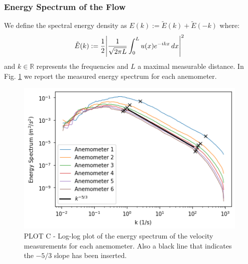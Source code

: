 \documentclass[11pt,titlepage]{article}
\begin{document}
\subsubsection{Energy Spectrum of the Flow} \label{energy_spectrum}
We define the spectral energy density as $E(k) :=\tilde{E}(k) + \tilde{E}(-k)$ where:
\begin{equation*}
	\tilde{E}(k):= \frac{1}{2} \abs{\frac{1}{\sqrt{2\pi L}} \int_0^L u(x) e^{-ikx}\, dx}^2
\end{equation*}
and $k\in \mathbb{R}$ represents the frequencies and $L$ a maximal measurable distance. 
In Fig. \ref{fig3} we report the measured energy spectrum for each anemometer.
	\begin{center} 
	\begin{figure} [h]
		\centering
		\includegraphics[width = 5in]{./figures/ex1_3.png}
		\caption{PLOT C - Log-log plot of the energy spectrum of the velocity measurements for each anemometer.  Also a black line that indicates the $-5/3$ slope has been inserted.}
		\label{fig3}
	\end{figure}
\end{center}
\end{document}
